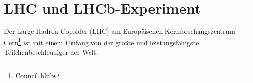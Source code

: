 \chapter{LHC und LHCb-Experiment}
Der Large Hadron Colloider (LHC) am Europäischen Kernforschungszentrum
Cern\footnote{Council blub} ist mit einem Umfang von \SI{}{\kilometer} der
größte und leistungsfähigste Teilchenbeschleuniger der Welt. 
